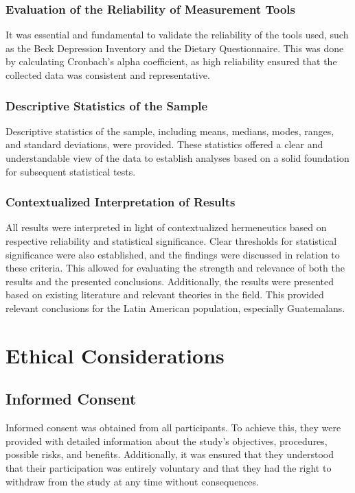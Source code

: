 \documentclass[jou]{apa7}
\begin{document}
\subsubsection{Evaluation of the Reliability of Measurement Tools}
It was essential and fundamental to validate the reliability of the tools used, such as the Beck Depression Inventory and the Dietary Questionnaire. This was done by calculating Cronbach's alpha coefficient, as high reliability ensured that the collected data was consistent and representative.

\subsubsection{Descriptive Statistics of the Sample}
Descriptive statistics of the sample, including means, medians, modes, ranges, and standard deviations, were provided. These statistics offered a clear and understandable view of the data to establish analyses based on a solid foundation for subsequent statistical tests.

\subsubsection{Contextualized Interpretation of Results}
All results were interpreted in light of contextualized hermeneutics based on respective reliability and statistical significance. Clear thresholds for statistical significance were also established, and the findings were discussed in relation to these criteria. This allowed for evaluating the strength and relevance of both the results and the presented conclusions. Additionally, the results were presented based on existing literature and relevant theories in the field. This provided relevant conclusions for the Latin American population, especially Guatemalans.

\section{Ethical Considerations}\label{consideraciones-uxe9ticas}

\subsection{Informed Consent}\label{consentimiento-informado}

Informed consent was obtained from all participants. To achieve this, they were provided with detailed information about the study's objectives, procedures, possible risks, and benefits. Additionally, it was ensured that they understood that their participation was entirely voluntary and that they had the right to withdraw from the study at any time without consequences.
\end{document}

